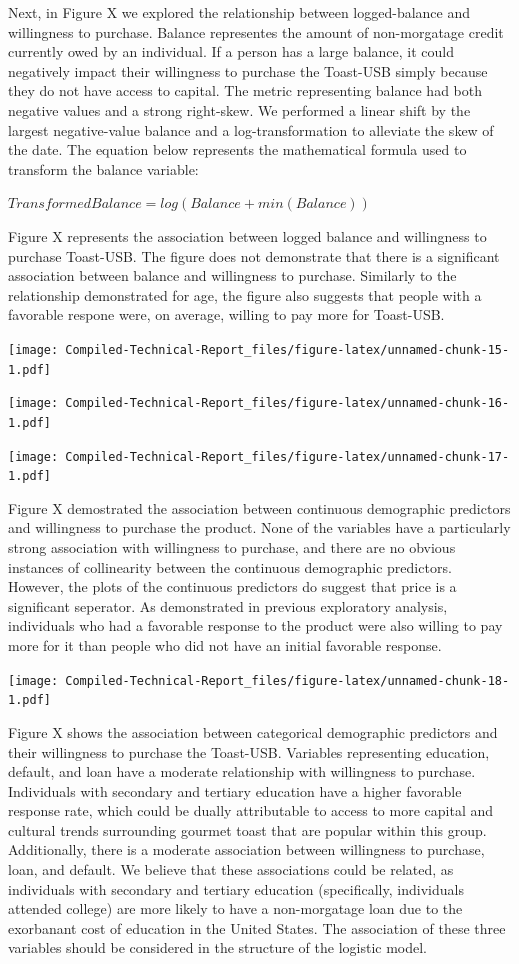 \documentclass[]{article}
\begin{document}
Next, in Figure X we explored the relationship between logged-balance
and willingness to purchase. Balance representes the amount of
non-morgatage credit currently owed by an individual. If a person has a
large balance, it could negatively impact their willingness to purchase
the Toast-USB simply because they do not have access to capital. The
metric representing balance had both negative values and a strong
right-skew. We performed a linear shift by the largest negative-value
balance and a log-transformation to alleviate the skew of the date. The
equation below represents the mathematical formula used to transform the
balance variable:

\(Transformed Balance = log(Balance + min(Balance))\)

Figure X represents the association between logged balance and
willingness to purchase Toast-USB. The figure does not demonstrate that
there is a significant association between balance and willingness to
purchase. Similarly to the relationship demonstrated for age, the figure
also suggests that people with a favorable respone were, on average,
willing to pay more for Toast-USB.

\texttt{[image: Compiled-Technical-Report\_files/figure-latex/unnamed-chunk-15-1.pdf]}

\texttt{[image: Compiled-Technical-Report\_files/figure-latex/unnamed-chunk-16-1.pdf]}

\texttt{[image: Compiled-Technical-Report\_files/figure-latex/unnamed-chunk-17-1.pdf]}

Figure X demostrated the association between continuous demographic
predictors and willingness to purchase the product. None of the
variables have a particularly strong association with willingness to
purchase, and there are no obvious instances of collinearity between the
continuous demographic predictors. However, the plots of the continuous
predictors do suggest that price is a significant seperator. As
demonstrated in previous exploratory analysis, individuals who had a
favorable response to the product were also willing to pay more for it
than people who did not have an initial favorable response.

\texttt{[image: Compiled-Technical-Report\_files/figure-latex/unnamed-chunk-18-1.pdf]}

Figure X shows the association between categorical demographic
predictors and their willingness to purchase the Toast-USB. Variables
representing education, default, and loan have a moderate relationship
with willingness to purchase. Individuals with secondary and tertiary
education have a higher favorable response rate, which could be dually
attributable to access to more capital and cultural trends surrounding
gourmet toast that are popular within this group. Additionally, there is
a moderate association between willingness to purchase, loan, and
default. We believe that these associations could be related, as
individuals with secondary and tertiary education (specifically,
individuals attended college) are more likely to have a non-morgatage
loan due to the exorbanant cost of education in the United States. The
association of these three variables should be considered in the
structure of the logistic model.
\end{document}
